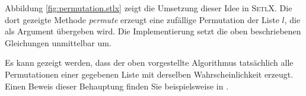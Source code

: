 Abbildung \ref{fig:permutation.stlx} zeigt die Umsetzung dieser Idee in \textsc{SetlX}.
Die dort gezeigte Me\-thode \textsl{permute} erzeugt eine zuf\"allige Permutation der Liste $l$, die
als Argument \"uber\-geben wird.  Die Implementierung setzt die oben beschriebenen Gleichungen
unmittelbar um.

Es kann gezeigt werden, dass der oben vorgestellte Algorithmus tats\"achlich alle Permutationen einer
gegebenen Liste mit derselben Wahrscheinlichkeit erzeugt.  Einen Beweis dieser Behauptung
finden Sie beispielsweise in \cite{cormen:01}.



